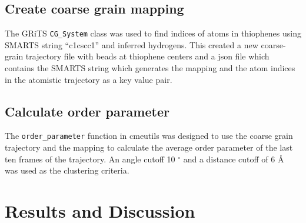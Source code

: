 \subsection{Create coarse grain mapping}
The GRiTS \lstinline{CG_System} class was used to find indices of atoms in thiophenes using SMARTS string ``c1cscc1'' and inferred hydrogens. This created a new coarse-grain trajectory file with beads at thiophene centers and a json file which contains the SMARTS string which generates the mapping and the atom indices in the atomistic trajectory as a key value pair.

\subsection{Calculate order parameter}
The \lstinline{order_parameter} function in cmeutils was designed to use the coarse grain trajectory and the mapping to calculate the average order parameter of the last ten frames of the trajectory. An angle cutoff 10 $^{\circ}$ and a distance cutoff of 6 \AA~ was used as the clustering criteria.

\section{Results and Discussion}

